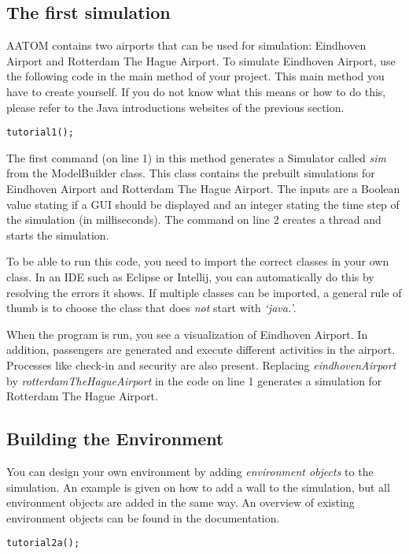 \documentclass{article}
\begin{document}
\subsection{The first simulation}
AATOM contains two airports that can be used for simulation: Eindhoven Airport and Rotterdam The Hague Airport. To simulate Eindhoven Airport, use the following code in the main method of your project. This main method you have to create yourself. If you do not know what this means or how to do this, please refer to the Java introductions websites of the previous section.

\begin{verbatim}
tutorial1();
\end{verbatim}

The first command (on line 1) in this method generates a Simulator called \textit{sim} from the ModelBuilder class. This class contains the prebuilt simulations for Eindhoven Airport and Rotterdam The Hague Airport. The inputs are a Boolean value stating if a GUI should be displayed and an integer stating the time step of the simulation (in milliseconds). The command on line 2 creates a thread and starts the simulation.

To be able to run this code, you need to import the correct classes in your own class. In an IDE such as Eclipse or Intellij, you can automatically do this by resolving the errors it shows. If multiple classes can be imported, a general rule of thumb is to choose the class that does \textit{not} start with \textit{`java.'}. 

When the program is run, you see a visualization of Eindhoven Airport. In addition, passengers are generated and execute different activities in the airport. Processes like check-in and security are also present. Replacing \mbox{\textit{eindhovenAirport}} by \mbox{\textit{rotterdamTheHagueAirport}} in the code on line 1 generates a simulation for Rotterdam The Hague Airport.

\subsection{Building the Environment}
You can design your own environment by adding \textit{environment objects} to the simulation. An example is given on how to add a wall to the simulation, but all environment objects are added in the same way. An overview of existing environment objects can be found in the documentation.

\begin{verbatim}
tutorial2a();
\end{verbatim}
\end{document}
